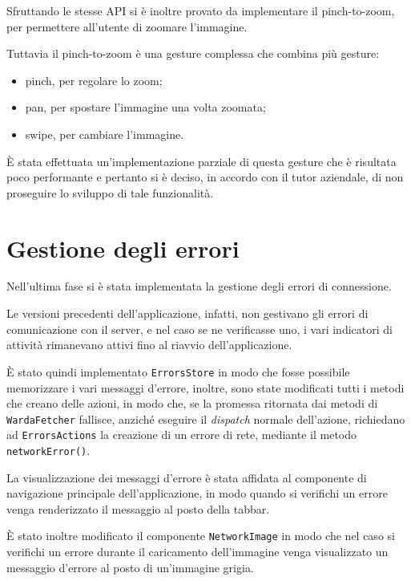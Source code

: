 Sfruttando le stesse API si è inoltre provato da implementare il pinch-to-zoom, per permettere all'utente di zoomare l'immagine.

Tuttavia il pinch-to-zoom è una gesture complessa che combina più gesture:
\begin{itemize}
\item pinch, per regolare lo zoom;
\item pan, per spostare l'immagine una volta zoomata;
\item swipe, per cambiare l'immagine.
\end{itemize}

\`E stata effettuata un'implementazione parziale di questa gesture che è risultata poco performante e pertanto si è deciso, in accordo con il tutor aziendale, di non proseguire lo sviluppo di tale funzionalità.

\section{Gestione degli errori}

Nell'ultima fase si è stata implementata la gestione degli errori di connessione.

Le versioni precedenti dell'applicazione, infatti, non gestivano gli errori di comunicazione con il server, e nel caso se ne verificasse uno, i vari indicatori di attività rimanevano attivi fino al riavvio dell'applicazione.

\`E stato quindi implementato \texttt{ErrorsStore} in modo che fosse possibile memorizzare i vari messaggi d'errore, inoltre, sono state modificati tutti i metodi che creano delle azioni, in modo che, se la promessa ritornata dai metodi di \texttt{WardaFetcher} fallisce, anziché eseguire il \textit{dispatch} normale dell'azione, richiedano ad \texttt{ErrorsActions} la creazione di un errore di rete, mediante il metodo \texttt{networkError()}.

La visualizzazione dei messaggi d'errore è stata affidata al componente di navigazione principale dell'applicazione, in modo quando si verifichi un errore venga renderizzato il messaggio al posto della tabbar.

\`E stato inoltre modificato il componente \texttt{NetworkImage} in modo che nel caso si verifichi un errore durante il caricamento dell'immagine venga visualizzato un messaggio d'errore al posto di un'immagine grigia.
